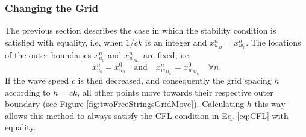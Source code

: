 \subsubsection{Changing the Grid}
The previous section describes the case in which the stability condition is satisfied with equality, i.e, when $1/ck$ is an integer and $x_{u_M}^n = x_{w_0}^n$. The locations of the outer boundaries $x_{u_0}^n$ and $x_{w_{M_w}}^n$ are fixed, i.e.
\begin{equation*}
    x_{u_0}^n = x_{u_0}^0 \quad \text{and}\quad x_{w_{M_w}}^n = x_{w_{M_w}}^0 \quad \forall n.
\end{equation*}
If the wave speed $c$ is then decreased, and consequently the grid spacing $h$ according to $h=ck$, all other points move towards their respective outer boundary (see Figure \ref{fig:twoFreeStringsGridMove}). Calculating $h$ this way allows this method to always satisfy the CFL condition in Eq. \eqref{eq:CFL} with equality. %

